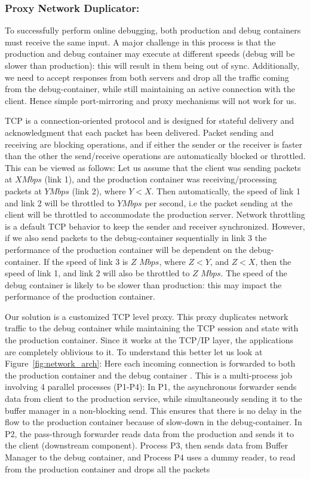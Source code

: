 \subsubsection{Proxy Network Duplicator:} 
\label{sec:parikshanProxyDuplicator}
To successfully perform online debugging, both production and debug containers must receive the same input.
A major challenge in this process is that the production and debug container may execute at different speeds (debug will be slower than production): this will result in them being out of sync.
Additionally, we need to accept responses from both servers and drop all the traffic coming from the debug-container, while still maintaining an active connection with the client.
Hence simple port-mirroring and proxy mechanisms will not work for us. 

TCP is a connection-oriented protocol and is designed for stateful delivery and acknowledgment that each packet has been delivered.
Packet sending and receiving are blocking operations, and if either the sender or the receiver is faster than the other the send/receive operations are automatically blocked or throttled.
This can be viewed as follows: Let us assume that the client was sending packets at $X Mbps$ (link 1), and the production container was receiving/processing packets at $Y Mbps$ (link 2), where $Y<X$. 
Then automatically, the speed of link 1 and link 2 will be throttled to $Y Mbps$ per second, i.e the packet sending at the client will be throttled to accommodate the production server. 
Network throttling is a default TCP behavior to keep the sender and receiver synchronized.
However, if we also send packets to the debug-container sequentially in link 3 the performance of the production container will be dependent on the debug-container. 
If the speed of link 3 is $Z$ $Mbps$, where $Z < Y$, and $Z < X$, then the speed of link 1, and link 2 will also be throttled to $Z$ $Mbps$.
The speed of the debug container is likely to be slower than production: this may impact the performance of the production container.

Our solution is a customized TCP level proxy. 
This proxy duplicates network traffic to the debug container while maintaining the TCP session and state with the production container. 
Since it works at the TCP/IP layer, the applications are completely oblivious to it.
To understand this better let us look at Figure~\ref{fig:network_arch}: Here each incoming connection is forwarded to both the production container and the debug container . 
This is a multi-process job involving 4 parallel processes (P1-P4): In P1, the asynchronous forwarder sends data from client to the production service, while simultaneously sending it to the buffer manager in a non-blocking send.  This ensures that there is no delay in the flow to the production container because of slow-down in the debug-container.
In P2, the pass-through forwarder reads data from the production and sends it to the client (downstream component).
Process P3, then sends data from Buffer Manager to the debug container, and Process P4 uses a dummy reader, to read from the production container and drops all the packets

